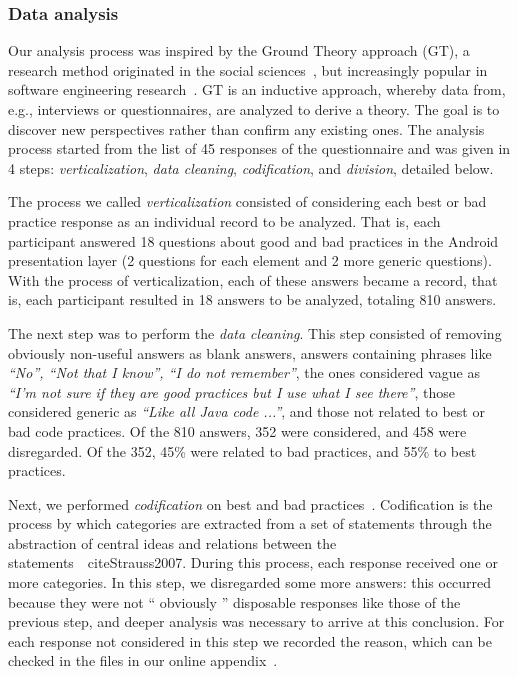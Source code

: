 \subsubsection{Data analysis}
\label{etapa-1-analise}

Our analysis process was inspired by the Ground Theory approach (GT), a research method originated in the social sciences~\cite{Strauss2007, GlaserStrauss1999}, but increasingly popular in software engineering research~\cite{Adolph2011}. 
GT is an inductive approach, whereby data from, e.g., interviews or questionnaires, are analyzed to derive a theory. The goal is to discover new perspectives rather than confirm any existing ones. The analysis process started from the list of 45 responses of the questionnaire and was given in 4 steps: \textit{verticalization}, \textit {data cleaning}, \textit {codification}, and \textit {division}, detailed below.

The process we called \textit{verticalization} consisted of considering each best or bad practice response as an individual record to be analyzed. That is, each participant answered 18 questions about good and bad practices in the Android presentation layer (2 questions for each element and 2 more generic questions). With the process of verticalization, each of these answers became a record, that is, each participant resulted in 18 answers to be analyzed, totaling 810 answers.

The next step was to perform the \textit{data cleaning}. This step consisted of removing obviously non-useful answers as blank answers, answers containing phrases like \textit{``No'', ``Not that I know'', ``I do not remember''}, the ones considered vague as \textit{``I'm not sure if they are good practices but I use what I see there''}, those considered generic as \textit{``Like all Java code ...''}, and those not related to best or bad code practices. Of the 810 answers, 352 were considered, and 458 were disregarded. Of the 352, 45\% were related to bad practices, and 55\% to best practices.

Next, we performed \textit{codification} on best and bad practices~\cite{Strauss2007, Saldana2013}. Codification is the process by which categories are extracted from a set of statements through the abstraction of central ideas and relations between the statements~\ cite{Strauss2007}. During this process, each response received one or more categories. In this step, we disregarded some more answers: this occurred because they were not `` obviously '' disposable responses like those of the previous step, and deeper analysis was necessary to arrive at this conclusion. For each response not considered in this step we recorded the reason, which can be checked in the files in our online appendix~\cite{apendice}.

